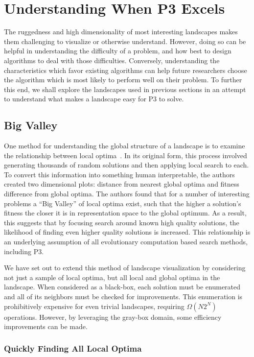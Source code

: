 \chapter{Understanding When P3 Excels}
The ruggedness and high dimensionality of most interesting landscapes makes them challenging
to visualize or otherwise understand. However, doing so can be helpful in
understanding the difficulty of a problem, and how best to design algorithms to deal
with those difficulties. Conversely, understanding the characteristics which favor
existing algorithms can help future researchers choose the algorithm which is
most likely to perform well on their problem. To further this end, we shall
explore the landscapes used in previous sections in an attempt to understand
what makes a landscape easy for P3 to solve.


\section{Big Valley}
One method for understanding the global structure of a landscape
is to examine the relationship between local optima~\cite{boese:1994:bigvalley}.
In its original form, this process involved generating thousands of random solutions and then applying
local search to each. To convert this information into something human interpretable,
the authors created two dimensional plots: distance from nearest global optima and
fitness difference from global optima.
The authors found that for a number of interesting problems a ``Big Valley'' of
local optima exist, such that the higher a solution's fitness the closer it is
in representation space to the global optimum. As a result, this suggests that
by focusing search around known high quality solutions, the likelihood of finding even
higher quality solutions is increased. This relationship is an underlying assumption
of all evolutionary computation based search methods, including P3.

We have set out to extend this method of landscape visualization by considering not
just a sample of local optima, but all local and global optima in the landscape.
When considered as a black-box, each solution must be enumerated and all of its
neighbors must be checked for improvements. This enumeration is prohibitively expensive for
even trivial landscapes, requiring $\Omega(N2^N)$ operations.
However, by leveraging the gray-box domain, some efficiency improvements can be made.

\subsection{Quickly Finding All Local Optima}

